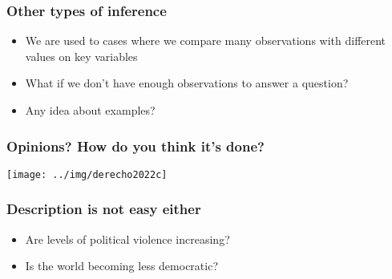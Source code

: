 \documentclass[aspectratio=43]{beamer}
\begin{document}





\begin{frame}
\frametitle{Other types of inference}
\centering

\begin{itemize}
  \item We are used to cases where we compare many observations with different values on key variables
  \item What if we don't have enough observations to answer a question?
  \item Any idea about examples?
\end{itemize}

\end{frame}
    


\begin{frame}
\frametitle{Opinions? How do you think it's done?}
\centering

\texttt{[image: ../img/derecho2022c]}

\end{frame}


\begin{frame}
\frametitle{Description is not easy either}
\centering

\begin{itemize}
  \item Are levels of political violence increasing?
  \item<2-> Is the world becoming less democratic?
\end{itemize}

\end{frame}
  
\end{document}
